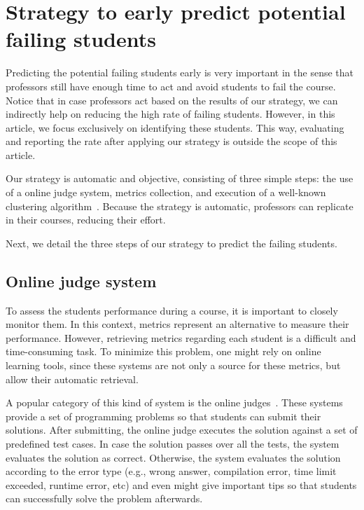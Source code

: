 \section{Strategy to early predict potential failing students}

\label{sec:strategy}

Predicting the potential failing students early is very important in the sense that professors still have enough time to act and avoid students to fail the course. Notice that in case professors act based on the results of our strategy, we can indirectly help on reducing the high rate of failing students. However, in this article, we focus exclusively on identifying these students. This way, evaluating and reporting the rate after applying our strategy is outside the scope of this article.

Our strategy is automatic and objective, consisting of three simple steps: the use of a online judge system, metrics collection, and execution of a well-known clustering algorithm~\cite{hartigan-clustering-algorithms-1975}. Because the strategy is automatic, professors can replicate in their courses, reducing their effort.

Next, we detail the three steps of our strategy to predict the failing students.

\subsection{Online judge system}

To assess the students performance during a course, it is important to closely monitor them. In this context, metrics represent an alternative to measure their performance. However, retrieving metrics regarding each student is a difficult and time-consuming task. To minimize this problem, one might rely on online learning tools, since these systems are not only a source for these metrics, but allow their automatic retrieval. 

A popular category of this kind of system is the online judges~\cite{uva, sphere}. These systems provide a set of programming problems so that students can submit their solutions. After submitting, the online judge executes the solution against a set of predefined test cases. In case the solution passes over all the tests, the system evaluates the solution as correct. Otherwise, the system evaluates the solution according to the error type (e.g., wrong answer, compilation error, time limit exceeded, runtime error, etc) and even might give important tips so that students can successfully solve the problem afterwards.

